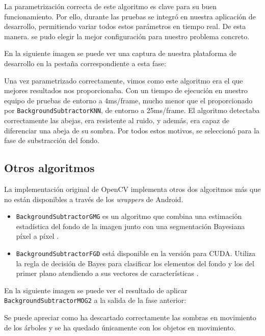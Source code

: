 La parametrización correcta de este algoritmo es clave para su buen
funcionamiento. Por ello, durante las pruebas se integró en nuestra
aplicación de desarrollo, permitiendo variar todos estos parámetros en
tiempo real. De esta manera. se pudo elegir la mejor configuración para
nuestro problema concreto.

En la siguiente imagen se puede ver una captura de nuestra plataforma de
desarrollo en la pestaña correspondiente a esta fase:


Una vez parametrizado correctamente, vimos como este algoritmo era el
que mejores resultados nos proporcionaba. Con un tiempo de ejecución en
nuestro equipo de pruebas de entorno a 4ms/frame, mucho menor que el
proporcionado por \texttt{BackgroundSubtractorKNN}, de entorno a
25ms/frame. El algoritmo detectaba correctamente las abejas, era
resistente al ruido, y además, era capaz de diferenciar una abeja de su
sombra. Por todos estos motivos, se seleccionó para la fase de
substracción del fondo.

\subsection{Otros algoritmos}\label{otros-algoritmos}

La implementación original de OpenCV implementa otros dos algoritmos más
que no están disponibles a través de los \emph{wrappers} de Android.

\begin{itemize}
\tightlist
\item
  \texttt{BackgroundSubtractorGMG} es un algoritmo que combina una
  estimación estadística del fondo de la imagen junto con una
  segmentación Bayesiana píxel a píxel \citep{opencv:bs_tutorial}.
\item
  \texttt{BackgroundSubtractorFGD} está disponible en la versión para
  CUDA. Utiliza la regla de decisión de Bayes para clasificar los
  elementos del fondo y los del primer plano atendiendo a sus vectores
  de características \citep{art:li_foreground_2003}.
\end{itemize}

En la siguiente imagen se puede ver el resultado de aplicar
\texttt{BackgroundSubtractorMOG2} a la salida de la fase anterior:


Se puede apreciar como ha descartado correctamente las sombras en
movimiento de los árboles y se ha quedado únicamente con los objetos en
movimiento.

